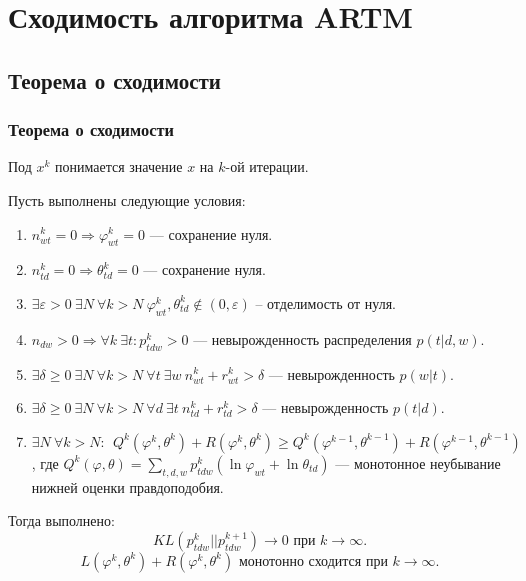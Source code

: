 \documentclass[utf8]{beamer}
\renewcommand{\geq}{\geqslant}
\renewcommand{\phi}{\varphi}
\begin{document}
	\section{Сходимость алгоритма ARTM}
	\subsection{Теорема о сходимости}
	
\begin{frame}
\frametitle{Теорема о сходимости}
\footnotesize{
Под $x^k$ понимается значение $x$ на $k$-ой итерации. 

Пусть выполнены следующие условия:
\begin{enumerate}
\item  $ n^k_{wt} = 0 \Rightarrow \phi^k_{wt} = 0$ --- сохранение нуля.
\item $n^k_{td} = 0 \Rightarrow \theta^k_{td} = 0$ --- сохранение нуля.
\item $\exists \varepsilon>0\ \exists N\ \forall k > N\ \phi^k_{wt}, \theta^k_{td} \notin (0, \varepsilon)$ -- отделимость от нуля.
\item  $ n_{dw}>0 \Rightarrow \forall k\ \exists t\colon p^k_{tdw} > 0$ --- невырожденность распределения $ p(t|d,w)$.
\item $\exists \delta\geq 0\ \exists N\ \forall k > N \ \forall t\ \exists w\  n^k_{wt} + r^k_{wt} > \delta$ --- невырожденность $p(w|t)$.
\item $\exists \delta\geq 0\ \exists N\ \forall k > N \ \forall d\ \exists t\  n^k_{td} + r^k_{td} > \delta$ --- невырожденность $p(t|d)$.
\item $\exists N\ \forall k > N\colon\ \ Q^k (\phi^k, \theta^k)+ R(\phi^k, \theta^k) \geq Q^k(\phi^{k-1}, \theta^{k-1}) + R(\phi^{k-1}, \theta^{k-1})$, где $Q^k(\phi, \theta) = \sum\limits_{t,d,w} p^k_{tdw} (\ln \phi_{wt} + \ln \theta_{td})$ ---  монотонное неубывание нижней оценки правдоподобия.
\end{enumerate}
Тогда выполнено:
\[
KL(p_{tdw}^{k}||p_{tdw}^{k + 1}) \to 0 \text{ при } k \to \infty.
\]
\[
L(\phi^k, \theta^k) + R(\phi^k, \theta^k) \text{ монотонно сходится при } k \to \infty.
\]
}
\end{frame}
\end{document}

